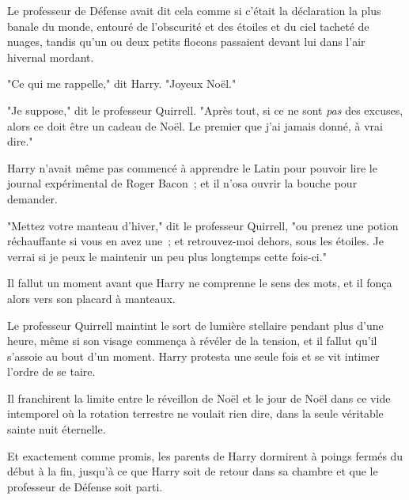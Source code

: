 Le professeur de Défense avait dit cela comme si c'était la déclaration la plus banale du monde, entouré de l'obscurité et des étoiles et du ciel tacheté de nuages, tandis qu'un ou deux petits flocons passaient devant lui dans l'air hivernal mordant.

"Ce qui me rappelle," dit Harry. "Joyeux Noël."

"Je suppose," dit le professeur Quirrell. "Après tout, si ce ne sont \emph{pas} des excuses, alors ce doit être un cadeau de Noël. Le premier que j'ai jamais donné, à vrai dire."

Harry n'avait même pas commencé à apprendre le Latin pour pouvoir lire le journal expérimental de Roger Bacon~; et il n'osa ouvrir la bouche pour demander.

"Mettez votre manteau d'hiver," dit le professeur Quirrell, "ou prenez une potion réchauffante si vous en avez une~; et retrouvez-moi dehors, sous les étoiles. Je verrai si je peux le maintenir un peu plus longtemps cette fois-ci."

Il fallut un moment avant que Harry ne comprenne le sens des mots, et il fonça alors vers son placard à manteaux.

Le professeur Quirrell maintint le sort de lumière stellaire pendant plus d'une heure, même si son visage commença à révéler de la tension, et il fallut qu'il s'assoie au bout d'un moment. Harry protesta une seule fois et se vit intimer l'ordre de se taire.

Il franchirent la limite entre le réveillon de Noël et le jour de Noël dans ce vide intemporel où la rotation terrestre ne voulait rien dire, dans la seule véritable sainte nuit éternelle.

Et exactement comme promis, les parents de Harry dormirent à poings fermés du début à la fin, jusqu'à ce que Harry soit de retour dans sa chambre et que le professeur de Défense soit parti.
